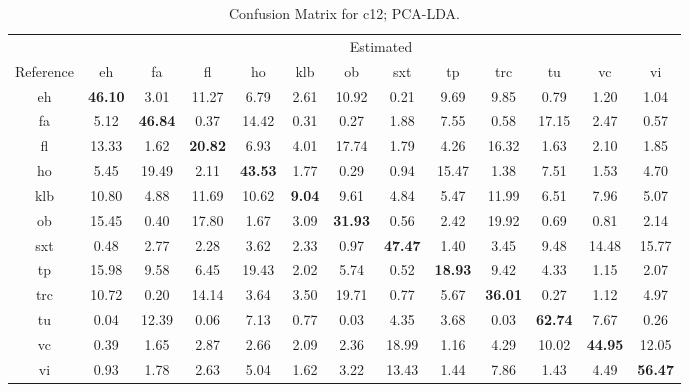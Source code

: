 \begin{landscape}
\begin{table*} %
\begin{center}
\caption{Confusion Matrix for c12; PCA-LDA.}
\begin{tabular}{c | cccccccccccc}
\hline
& \multicolumn{12}{c}{Estimated}\\
 Reference  & eh &    fa &   fl &    ho &   klb &    ob &   sxt &    tp &   trc &    tu &    vc &    vi \\
\hline
 eh  & \textbf{46.10} &  3.01 & 11.27 &  6.79 &  2.61 & 10.92 &  0.21 &  9.69 &  9.85 &  0.79 &  1.20 &  1.04 \\
 fa  &  5.12 & \textbf{46.84} &  0.37 & 14.42 &  0.31 &  0.27 &  1.88 &  7.55 &  0.58 & 17.15 &  2.47 &  0.57 \\
 fl & 13.33 &  1.62 & \textbf{20.82} &  6.93 &  4.01 & 17.74 &  1.79 &  4.26 & 16.32 &  1.63 &  2.10 &  1.85 \\
 ho  &  5.45 & 19.49 &  2.11 & \textbf{43.53} &  1.77 &  0.29 &  0.94 & 15.47 &  1.38 &  7.51 &  1.53 &  4.70 \\
 klb & 10.80 &  4.88 & 11.69 & 10.62 &  \textbf{9.04} &  9.61 &  4.84 &  5.47 & 11.99 &  6.51 &  7.96 &  5.07 \\
 ob  & 15.45 &  0.40 & 17.80 &  1.67 &  3.09 & \textbf{31.93} &  0.56 &  2.42 & 19.92 &  0.69 &  0.81 &  2.14 \\
 sxt &  0.48 &  2.77 &  2.28 &  3.62 &  2.33 &  0.97 & \textbf{47.47} &  1.40 &  3.45 &  9.48 & 14.48 & 15.77 \\
 tp  & 15.98 &  9.58 &  6.45 & 19.43 &  2.02 &  5.74 &  0.52 & \textbf{18.93} &  9.42 &  4.33 &  1.15 &  2.07 \\
 trc & 10.72 &  0.20 & 14.14 &  3.64 &  3.50 & 19.71 &  0.77 &  5.67 & \textbf{36.01} &  0.27 &  1.12 &  4.97 \\
 tu  &  0.04 & 12.39 &  0.06 &  7.13 &  0.77 &  0.03 &  4.35 &  3.68 &  0.03 & \textbf{62.74} &  7.67 &  0.26 \\
 vc  &  0.39 &  1.65 &  2.87 &  2.66 &  2.09 &  2.36 & 18.99 &  1.16 &  4.29 & 10.02 & \textbf{44.95} & 12.05 \\
 vi  &  0.93 &  1.78 &  2.63 &  5.04 &  1.62 &  3.22 & 13.43 &  1.44 &  7.86 &  1.43 &  4.49 & \textbf{56.47} \\
\hline
\end{tabular}
\label{tab:confmat_pcalda}
\end{center}
\end{table*}
\end{landscape}


